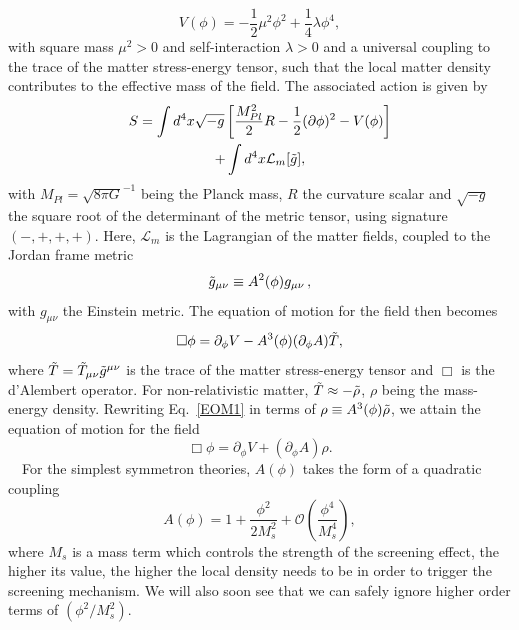 \documentclass[nofootinbib,twocolumn]{revtex4}
\begin{document}
\begin{equation}
    V(\phi) = -\frac{1}{2}\mu^2\phi^2+\frac{1}{4}\lambda\phi^4,
\end{equation}
with square mass $\mu^2>0$ and self-interaction $\lambda>0$ and a universal coupling to the trace of the matter stress-energy tensor, such that the local matter density contributes to the effective mass of the field.
The associated action is given by \cite{Hinterbichler:2010es} 
\begin{multline}
        S = \int d^4x \sqrt{-g}\left[\frac{M_{Pl}^2}{2}R - \frac{1}{2}(\partial\phi)^2-V(\phi) \right] \\
   + \int d^4x \mathcal{L}_m[\Tilde{g}],
   \label{Action}
\end{multline}
with $M_{Pl} = \sqrt{8\pi G}^{-1}$ being the Planck mass, $R$ the curvature scalar and $\sqrt{-g}$ the square root of the determinant of the metric tensor, using signature $(-,+,+,+)$.
Here, $\mathcal{L}_m$ is the Lagrangian of the matter fields, coupled to the Jordan frame metric
\begin{equation}
    \Tilde{g}_{\mu\nu} \equiv A^2(\phi)g_{\mu\nu}\,,
\end{equation}
with $g_{\mu\nu}$ the Einstein metric.
The equation of motion for the field then becomes
\begin{equation}
    \Box\phi = \partial_{\phi} V - A^3(\phi)(\partial_{\phi} A)\Tilde{T},
    \label{EOM1}
\end{equation}
where $\Tilde{T} = \Tilde{T}_{\mu\nu}\Tilde{g}^{\mu\nu}$ is the trace of the matter stress-energy tensor  and $\Box$ is the d'Alembert operator. For non-relativistic matter, $\Tilde{T} \approx -\Tilde{\rho}$, $\rho$ being the mass-energy density.
Rewriting Eq.~\eqref{EOM1} in terms of $\rho \equiv A^3(\phi)\Tilde{\rho}$, we attain the equation of motion for the field
\begin{equation}
    \Box\phi = \partial_{\phi} V + (\partial_{\phi} A)\rho.
    \label{FullEOM}
\end{equation}
~~For the simplest symmetron theories, $A(\phi)$ takes the form of a quadratic coupling \cite{Hinterbichler:2011ca}
\begin{equation}
    A(\phi) = 1+\frac{\phi^2}{2M_s^2}+\mathcal{O}\left(\frac{\phi^4}{M_s^4}\right),
\end{equation}
where $M_s$ is a mass term which controls the strength of the screening effect, the higher its value, the higher the local density needs to be in order to trigger the screening mechanism. We will also soon see that we can safely ignore higher order terms of $\left(\phi^2 / M_s^2\right)$.
\end{document}
